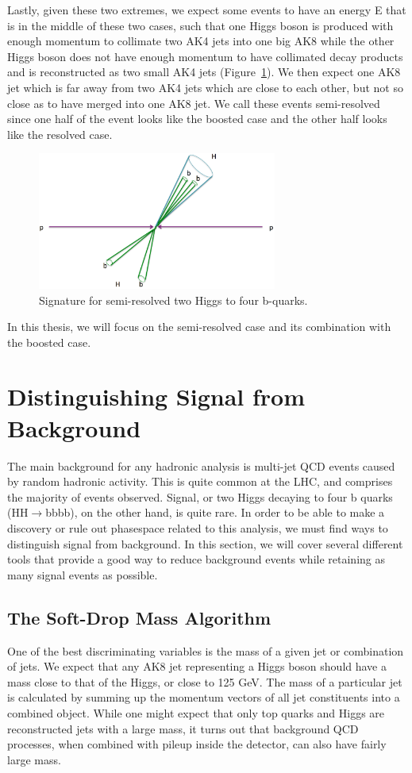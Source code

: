 Lastly, given these two extremes, we expect some events to have an energy E that is in the middle of these two cases, such that one Higgs boson is produced with enough momentum to collimate two AK4 jets into one big AK8 while the other Higgs boson does not have enough momentum to have collimated decay products and is reconstructed as two small AK4 jets (Figure~\ref{Fig:threecases3}). We then expect one AK8 jet which is far away from two AK4 jets which are close to each other, but not so close as to have merged into one AK8 jet. We call these events semi-resolved since one half of the event looks like the boosted case and the other half looks like the resolved case. 
\begin{figure}[h!]
    \centering
        \includegraphics[width=0.7\textwidth]{F4/semiresolved.png}
        \caption{Signature for semi-resolved two Higgs to four b-quarks.}
        \label{Fig:threecases3}
\end{figure}
In this thesis, we will focus on the semi-resolved case and its combination with the boosted case.
\vspace{5mm}

\section{Distinguishing Signal from Background}
The main background for any hadronic analysis is multi-jet QCD events caused by random hadronic activity. This is quite common at the LHC, and comprises the majority of events observed. Signal, or two Higgs decaying to four b quarks (HH$\rightarrow$bbbb), on the other hand, is quite rare. In order to be able to make a discovery or rule out phasespace related to this analysis, we must find ways to distinguish signal from background. In this section, we will cover several different tools that provide a good way to reduce background events while retaining as many signal events as possible.


\subsection{The Soft-Drop Mass Algorithm}
One of the best discriminating variables is the mass of a given jet or combination of jets. We expect that any AK8 jet representing a Higgs boson should have a mass close to that of the Higgs, or close to 125 GeV. The mass of a particular jet is calculated by summing up the momentum vectors of all jet constituents into a combined object. While one might expect that only top quarks and Higgs are reconstructed jets with a large mass, it turns out that background QCD processes, when combined with pileup inside the detector, can also have fairly large mass. 

